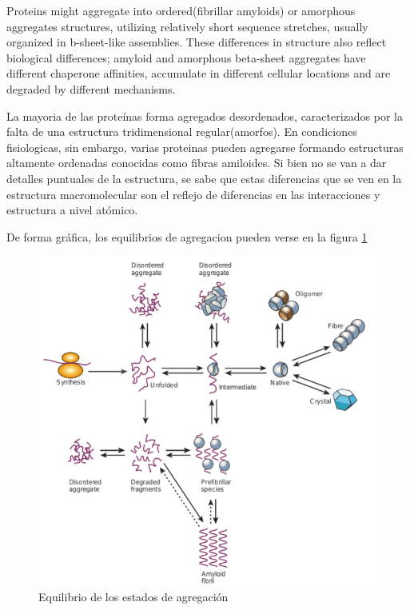 Proteins might aggregate into ordered(fibrillar amyloids) or amorphous aggregates structures, utilizing relatively short sequence stretches, usually organized in b-sheet-like assemblies. 
These differences in structure also reflect biological differences; amyloid and amorphous beta-sheet aggregates have different chaperone affinities, accumulate in different cellular locations and are degraded by different mechanisms.

La mayoria de las proteínas forma agregados desordenados, caracterizados por la falta de una estructura tridimensional regular(amorfos).
En condiciones fisiologicas, sin embargo, varias proteinas pueden agregarse formando estructuras altamente ordenadas conocidas como fibras amiloides.
Si bien no se van a dar detalles puntuales de la estructura, se sabe que estas diferencias que se ven en la estructura macromolecular son el reflejo de diferencias en las interacciones y estructura a nivel atómico.


De forma gráfica, los equilibrios de agregacion pueden verse en la figura \ref{aggregationDiagram}

\begin{figure}[h!,centered]
\includegraphics[width=\textwidth]{img/aggregationDiagram.png} 
\caption{Equilibrio de los estados de agregación} \label{aggregationDiagram}
\end{figure}



